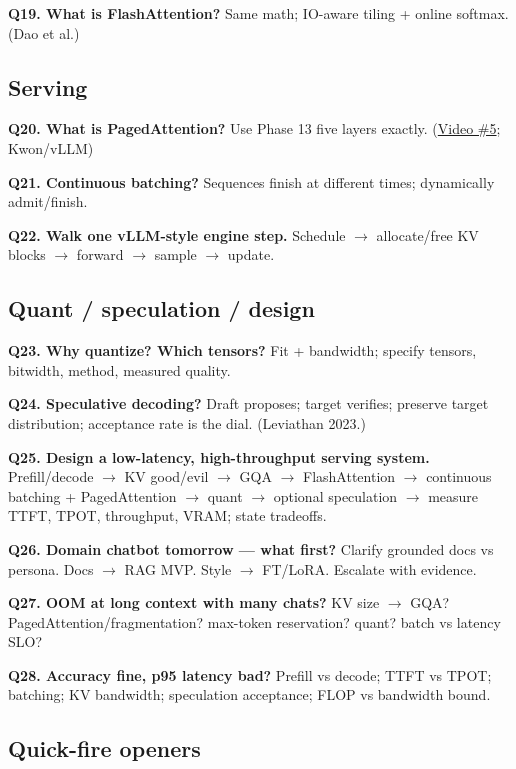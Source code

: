 \documentclass[11pt,a4paper]{article}
\begin{document}
{{\textbf{Q19. What is FlashAttention?}   Same math; IO-aware tiling + online softmax. (Dao et al.)


\subsection{Serving}


\textbf{Q20. What is PagedAttention?}   Use Phase 13 five layers exactly. (\href{https://www.youtube.com/watch?v=-AB6m0Spo6c}{Video \#5}; Kwon/vLLM)


\textbf{Q21. Continuous batching?}   Sequences finish at different times; dynamically admit/finish.


\textbf{Q22. Walk one vLLM-style engine step.}   Schedule $\rightarrow$ allocate/free KV blocks $\rightarrow$ forward $\rightarrow$ sample $\rightarrow$ update.


\subsection{Quant / speculation / design}


\textbf{Q23. Why quantize? Which tensors?}   Fit + bandwidth; specify tensors, bitwidth, method, measured quality.


\textbf{Q24. Speculative decoding?}   Draft proposes; target verifies; preserve target distribution; acceptance rate is the dial. (Leviathan 2023.)


\textbf{Q25. Design a low-latency, high-throughput serving system.}   Prefill/decode $\rightarrow$ KV good/evil $\rightarrow$ GQA $\rightarrow$ FlashAttention $\rightarrow$ continuous batching + PagedAttention $\rightarrow$ quant $\rightarrow$ optional speculation $\rightarrow$ measure TTFT, TPOT, throughput, VRAM; state tradeoffs.


\textbf{Q26. Domain chatbot tomorrow --- what first?}   Clarify grounded docs vs persona. Docs $\rightarrow$ RAG MVP. Style $\rightarrow$ FT/LoRA. Escalate with evidence.


\textbf{Q27. OOM at long context with many chats?}   KV size $\rightarrow$ GQA? PagedAttention/fragmentation? max-token reservation? quant? batch vs latency SLO?


\textbf{Q28. Accuracy fine, p95 latency bad?}   Prefill vs decode; TTFT vs TPOT; batching; KV bandwidth; speculation acceptance; FLOP vs bandwidth bound.


\subsection{Quick-fire openers}


}}
\end{document}
